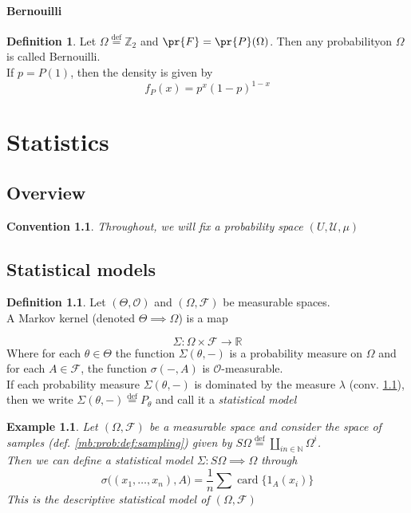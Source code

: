 \documentclass{book}
\theoremstyle{plain}
\newtheorem{convention}[corollary]{Convention}
\newtheorem{example}[corollary]{Example}
\theoremstyle{definition}
\newtheorem{definition}[corollary]{Definition}
\DeclareMathOperator{\card}{card}
\renewcommand{\d}[1]{\mathbb{#1}}
\newcommand{\define}{\stackrel{\operatorname{def}}{=}}
\newcommand{\mor}{\longrightarrow}
\renewcommand{\r}[1]{\mathcal{#1}}
\begin{document}
\subsubsection{Bernouilli}
\begin{definition}
Let $\Omega\define \d{Z}_2$ and $\pr{F}=\pr{P}(\Omega)$. Then any probabilityon $\Omega$ is called Bernouilli.\\
If $p=P(1)$, then the density is given by
\[
f_P(x) = p^x(1-p)^{1-x}
\]
\end{definition}
\chapter{Statistics}


\section{Overview}
\begin{convention}\label{conv:stats_univ-prob}
Throughout, we will fix a probability space $(U,\r{U},\mu)$
\end{convention}
\section{Statistical models}
\begin{definition}
Let $(\Theta, \r{O})$ and $(\Omega,\r{F})$ be measurable spaces.\\
A Markov kernel (denoted $\Theta\implies \Omega$) is a map

\[
\Sigma: \Omega \times \r{F}\mor \d{R}
\]
Where for each $\theta \in \Theta$ the function $\Sigma(\theta,-)$ is a probability measure on $\Omega$ and for each $A \in\r{F}$, the function $\sigma(-,A)$ is $\r{O}$-measurable.\\
If each probability measure $\Sigma(\theta,-)$ is dominated by the measure $\lambda$ (conv. \ref{conv:stats_univ-prob}), then we write $\Sigma(\theta,-)\define P_\theta$ and call it a \emph{statistical model}
\end{definition}

\begin{example}
Let $(\Omega, \r{F})$ be a measurable space and consider the  space  of samples (def. \ref{mb:prob:def:sampling}) given by $S\Omega\define \coprod_{in \in\d{N}}\Omega^i$.\\
Then we can define a statistical model $\Sigma: S\Omega \implies \Omega$ through
\[
\sigma\big((x_1,\ldots, x_n), A\big)=\frac{1}{n}\sum \card\big\{1_{A}(x_i)\big\}
\]
This is the descriptive statistical model of $(\Omega, \r{F})$\end{example}
\end{document}
